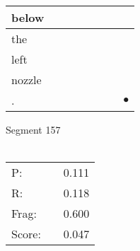 \documentclass[landscape]{article}
\newcommand{\ssp}{\hspace{2pt}}
\newcommand{\mex}{\cellcolor{g}$\bullet$}
\begin{document}
\begin{tabular}{|l|p{10pt}|p{10pt}|p{10pt}|p{10pt}|p{10pt}|p{10pt}|p{10pt}|}
\hline
\ssp below \ssp&\hspace{2pt}&\hspace{2pt}&\hspace{2pt}&\hspace{2pt}&\hspace{2pt}&\hspace{2pt}&\hspace{2pt}\\
\hline
\ssp the \ssp&\hspace{2pt}&\hspace{2pt}&\hspace{2pt}&\hspace{2pt}&\hspace{2pt}&\hspace{2pt}&\hspace{2pt}\\
\hline
\ssp left \ssp&\hspace{2pt}&\hspace{2pt}&\hspace{2pt}&\hspace{2pt}&\hspace{2pt}&\hspace{2pt}&\hspace{2pt}\\
\hline
\ssp nozzle \ssp&\hspace{2pt}&\hspace{2pt}&\hspace{2pt}&\hspace{2pt}&\hspace{2pt}&\hspace{2pt}&\hspace{2pt}\\
\hline
\ssp \cellcolor{ref6}. \ssp&\hspace{2pt}&\hspace{2pt}&\hspace{2pt}&\hspace{2pt}&\hspace{2pt}&\hspace{2pt}&\hspace{2pt}\mex\\
\hline
\end{tabular}

\vspace{6pt}
\noindent Segment 157\\\\
\noindent\begin{tabular}{lm{12pt}r}
\hline
P:&&0.111\\
R:&&0.118\\
Frag:&&0.600\\
Score:&&0.047\\
\end{tabular}
\end{document}
